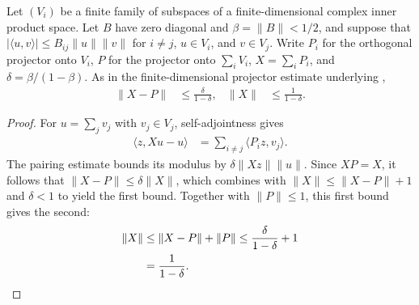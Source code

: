 \begin{lemma}
    \label{thm:ph_sum_block_projectors}
    \leanok
    Let $(V_i)$ be a finite family of subspaces of a finite-dimensional
    complex inner product space. Let $B$ have zero diagonal and
    $\beta=\lVert B\rVert<1/2$, and suppose that
    $|\langle u,v\rangle|\leq B_{ij}\lVert u\rVert\lVert v\rVert$
    for $i\ne j$, $u\in V_i$, and $v\in V_j$.
    Write $P_i$ for the orthogonal projector onto $V_i$, $P$ for the
    projector onto $\sum_i V_i$, $X=\sum_i P_i$, and
    $\delta=\beta/(1-\beta)$. As in the finite-dimensional projector estimate
    underlying \cite[Lemma~6.1(i)]{Nachtergaele1996Spectral},
    \begin{align}
        \lVert X-P\rVert & \leq\frac{\delta}{1-\delta}, &
        \lVert X\rVert   & \leq\frac{1}{1-\delta}.
    \end{align}
\end{lemma}
\begin{proof}
    \leanok
    For $u=\sum_j v_j$ with $v_j\in V_j$, self-adjointness gives
    \begin{align}
        \langle z,Xu-u\rangle & =\sum_{i\ne j}\langle P_i z,v_j\rangle.
    \end{align}
    The pairing estimate bounds its modulus by
    $\delta\lVert Xz\rVert\lVert u\rVert$.
    Since $XP=X$, it follows that $\lVert X-P\rVert\leq\delta\lVert X\rVert$,
    which combines with $\lVert X\rVert\leq\lVert X-P\rVert+1$ and $\delta<1$ to
    yield the first bound.
    Together with $\lVert P\rVert\leq1$, this first bound gives the second:
    \begin{align}
        \lVert X\rVert & \leq\lVert X-P\rVert+\lVert P\rVert
        \leq\frac{\delta}{1-\delta}+1 \notag                 \\
                       & =\frac{1}{1-\delta}. \notag
    \end{align}
\end{proof}

